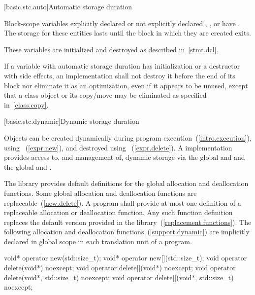 [basic.stc.auto]{Automatic storage duration}

\pnum
{}%
%
%
Block-scope variables explicitly declared  or
not explicitly declared , , or  have
. The storage
for these entities lasts until the block in which they are created exits.

\pnum
\enternote 
These variables are initialized and destroyed as described in~\ref{stmt.dcl}.
\exitnote 

\pnum
If a variable with automatic storage duration has initialization or a destructor with side
effects, an implementation shall not destroy it before the end of its block
nor eliminate it as an optimization, even if it appears to be
unused, except that a class object or its copy/move may be eliminated as
specified in~\ref{class.copy}.

[basic.stc.dynamic]{Dynamic storage duration}%

\pnum
Objects can be created dynamically during program
execution~(\ref{intro.execution}), using
%
~(\ref{expr.new}), and destroyed using
%
~(\ref{expr.delete}). A \Cpp implementation
provides access to, and management of, dynamic storage via the global
  and  and the global   and .

\pnum
The library provides default definitions for the global allocation and
deallocation functions. Some global allocation and deallocation
functions are replaceable~(\ref{new.delete}). A \Cpp program shall
provide at most one definition of a replaceable allocation or
deallocation function. Any such function definition replaces the default
version provided in the library~(\ref{replacement.functions}). The
following allocation and deallocation functions~(\ref{support.dynamic})
are implicitly declared in global scope in each translation unit of a
program.

\begin{codeblock}
void* operator new(std::size_t);
void* operator new[](std::size_t);
void operator delete(void*) noexcept;
void operator delete[](void*) noexcept;
void operator delete(void*, std::size_t) noexcept;
void operator delete[](void*, std::size_t) noexcept;
\end{codeblock}

